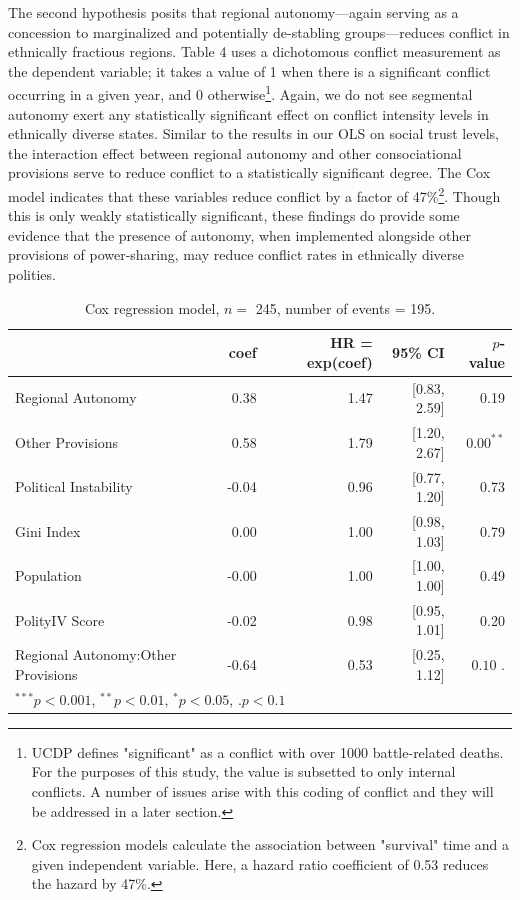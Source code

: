 \documentclass[12pt]{article}
\begin{document}
The second hypothesis posits that regional autonomy---again serving as a concession to marginalized and potentially de-stabling groups---reduces conflict in ethnically fractious regions. Table 4 uses a dichotomous conflict measurement as the dependent variable; it takes a value of 1 when there is a significant conflict occurring in a given year, and 0 otherwise\footnote{UCDP defines "significant" as a conflict with over 1000 battle-related deaths. For the purposes of this study, the value is subsetted to only internal conflicts. A number of issues arise with this coding of conflict and they will be addressed in a later section.}. Again, we do not see segmental autonomy exert any statistically significant effect on conflict intensity levels in ethnically diverse states. Similar to the results in our OLS on social trust levels, the interaction effect between regional autonomy and other consociational provisions serve to reduce conflict to a statistically significant degree. The Cox model indicates that these variables reduce conflict by a factor of 47\%\footnote{Cox regression models calculate the association between "survival" time and a given independent variable. Here, a hazard ratio coefficient of 0.53 reduces the hazard by 47\%.}. Though this is only weakly statistically significant, these findings do provide some evidence that the presence of autonomy, when implemented alongside other provisions of power-sharing, may reduce conflict rates in ethnically diverse polities. 

\begin{table}[!htbp]
	\centering
	\begin{tabular}{lrrrr}
		\hline
		& coef & HR = exp(coef) & 95\% CI & $p$-value \\ 
		\hline
		Regional Autonomy & 0.38 & 1.47 & [0.83, 2.59] & 0.19 \\ 
		Other Provisions & 0.58 & 1.79 & [1.20, 2.67] & $0.00^{**}$ \\ 
		Political Instability & -0.04 & 0.96 & [0.77, 1.20] & 0.73 \\ 
		Gini Index & 0.00 & 1.00 & [0.98, 1.03] & 0.79 \\ 
		Population & -0.00 & 1.00 & [1.00, 1.00] & 0.49 \\ 
		PolityIV Score & -0.02 & 0.98 & [0.95, 1.01] & 0.20 \\ 
		Regional Autonomy:Other Provisions & -0.64 & 0.53 & [0.25, 1.12] & $0.10 {\textbf{ .}}$ \\ 
		\hline
		\multicolumn{4}{l}{\scriptsize{$^{***}p<0.001$, $^{**}p<0.01$, $^*p<0.05$, $\textbf{.}p<0.1$}}
	\end{tabular}
	\caption{Cox regression model, $n = $ 245, number of events = 195.} 
	\label{mod}
\end{table}
\end{document}
